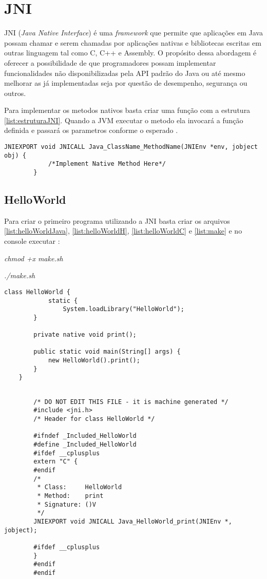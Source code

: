 \chapter{JNI}
\label{apend:jni}

JNI (\textit{Java Native Interface}) é uma \textit{framework} que permite que
aplicações em Java possam chamar e serem chamadas por aplicações nativas e
bibliotecas escritas em outras linguagem tal como C, C++ e Assembly.
O propósito dessa abordagem é oferecer a possibilidade de que programadores
possam implementar funcionalidades não disponibilizadas pela API padrão do Java
ou até mesmo melhorar as já implementadas seja por questão de desempenho,
segurança ou outros.

Para implementar os metodos nativos basta criar uma função com a estrutura
\ref{list:estruturaJNI}. Quando a JVM executar o metodo ela invocará a função
definida e passará os parametros conforme o esperado \cite{jniDoc}. 

	\begin{lstlisting}[caption=HelloWorld.java., label=list:estruturaJNI]	
		JNIEXPORT void JNICALL Java_ClassName_MethodName(JNIEnv *env, jobject obj) {
			/*Implement Native Method Here*/
		}
	\end{lstlisting}
	
\section{HelloWorld}

	Para criar o primeiro programa utilizando a JNI basta criar os arquivos
	\ref{list:helloWorldJava}, \ref{list:helloWorldH},
	\ref{list:helloWorldC} e \ref{list:make} e no console executar \cite{jniDoc}:
	
	\textit{chmod +x make.sh}
	
	\textit{./make.sh}


	\begin{lstlisting}[caption=HelloWorld.java., label=list:helloWorldJava]
	class HelloWorld {
			static {
				System.loadLibrary("HelloWorld");
	    }
	    
	    private native void print();
	        
	    public static void main(String[] args) {
	    	new HelloWorld().print();
	    }   
	}
	\end{lstlisting}
	
	\begin{lstlisting}[caption=HelloWorld.h., label=list:helloWorldH]
	
		/* DO NOT EDIT THIS FILE - it is machine generated */
		#include <jni.h>
		/* Header for class HelloWorld */
		 
		#ifndef _Included_HelloWorld
		#define _Included_HelloWorld
		#ifdef __cplusplus
		extern "C" {
		#endif
		/*
		 * Class:     HelloWorld
		 * Method:    print
		 * Signature: ()V
		 */
		JNIEXPORT void JNICALL Java_HelloWorld_print(JNIEnv *, jobject);
		 
		#ifdef __cplusplus
		}
		#endif
		#endif
	\end{lstlisting}
		
